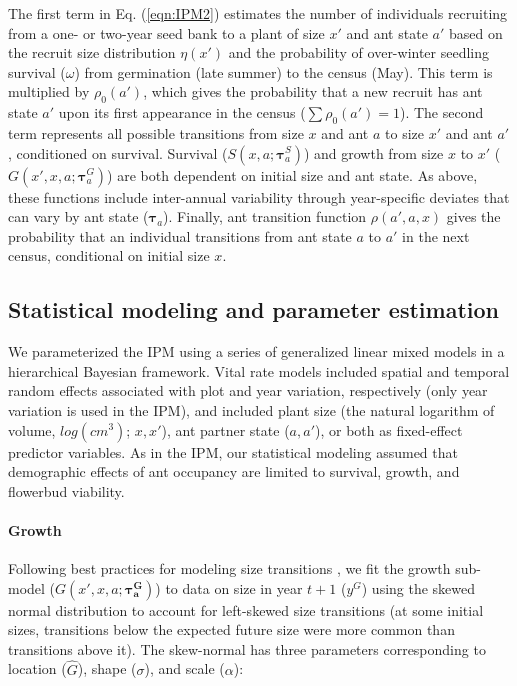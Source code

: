 \documentclass[11pt]{article}
\begin{document}
\noindent The first term in Eq. (\ref{eqn:IPM2}) estimates the number of individuals recruiting from a one- or two-year seed bank to a plant of size $x'$ and ant state $a'$ based on the recruit size distribution $\eta(x')$ and the probability of over-winter seedling survival ($\omega$) from germination (late summer) to the census (May).
This term is multiplied by $\rho_{0}(a')$, which gives the probability that a new recruit has ant state $a'$ upon its first appearance in the census ($\sum\rho_{0}(a')=1$). 
The second term represents all possible transitions from size $x$ and ant $a$ to size $x'$ and ant $a'$, conditioned on survival. 
Survival ($S(x,a;\pmb{\tau}^S_{a})$) and growth from size $x$ to $x'$ ($G(x',x,a;\pmb{\tau}^G_{a})$) are both dependent on initial size and ant state. 
As above, these functions include inter-annual variability through year-specific deviates that can vary by ant state ($\pmb{\tau}_{a}$). 
Finally, ant transition function $\rho(a',a,x)$ gives the probability that an individual transitions from ant state $a$ to $a'$ in the next census, conditional on initial size $x$. 

\subsection*{Statistical modeling and parameter estimation}
We parameterized the IPM using a series of generalized linear mixed models in a hierarchical Bayesian framework. 
Vital rate models included spatial and temporal random effects associated with plot and year variation, respectively (only year variation is used in the IPM), and included plant size (the natural logarithm of volume, $log(cm^3)$; $x,x'$), ant partner state ($a,a'$), or both as fixed-effect predictor variables. 
As in the IPM, our statistical modeling assumed that demographic effects of ant occupancy are limited to survival, growth, and flowerbud viability. 

\paragraph{Growth}
Following best practices for modeling size transitions \citep{miller2025my}, we fit the growth sub-model ($G(x',x,a;\pmb{\tau^G_{a}})$) to data on size in year $t+1$ ($y^G$) using the skewed normal distribution to account for left-skewed size transitions (at some initial sizes, transitions below the expected future size were more common than transitions above it). 
The skew-normal has three parameters corresponding to location ($\hat{G}$), shape ($\sigma$), and scale ($\alpha$):
\end{document}
